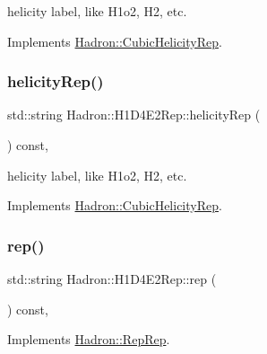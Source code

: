 helicity label, like H1o2, H2, etc. 

Implements \mbox{\hyperlink{structHadron_1_1CubicHelicityRep_af1096946b7470edf0a55451cc662f231}{Hadron\+::\+Cubic\+Helicity\+Rep}}.

\mbox{\label{structHadron_1_1H1D4E2Rep_a2c58d7ff3d9ef7f2adedc4e0a12db6cb}} 
\subsubsection{\texorpdfstring{helicityRep()}{helicityRep()}\hspace{0.1cm}{\footnotesize\ttfamily [2/2]}}
{\footnotesize\ttfamily std\+::string Hadron\+::\+H1\+D4\+E2\+Rep\+::helicity\+Rep (\begin{DoxyParamCaption}{ }\end{DoxyParamCaption}) const\hspace{0.3cm}{\ttfamily [inline]}, {\ttfamily [virtual]}}

helicity label, like H1o2, H2, etc. 

Implements \mbox{\hyperlink{structHadron_1_1CubicHelicityRep_af1096946b7470edf0a55451cc662f231}{Hadron\+::\+Cubic\+Helicity\+Rep}}.

\mbox{\label{structHadron_1_1H1D4E2Rep_a21042b3f507f32a467b776db77aa093f}} 
\subsubsection{\texorpdfstring{rep()}{rep()}\hspace{0.1cm}{\footnotesize\ttfamily [1/3]}}
{\footnotesize\ttfamily std\+::string Hadron\+::\+H1\+D4\+E2\+Rep\+::rep (\begin{DoxyParamCaption}{ }\end{DoxyParamCaption}) const\hspace{0.3cm}{\ttfamily [inline]}, {\ttfamily [virtual]}}



Implements \mbox{\hyperlink{structHadron_1_1RepRep_ab3213025f6de249f7095892109575fde}{Hadron\+::\+Rep\+Rep}}.

\mbox{\label{structHadron_1_1H1D4E2Rep_a21042b3f507f32a467b776db77aa093f}} 
